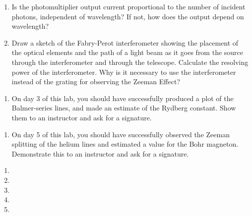 \documentclass{signatures}
\begin{document}
\begin{enumerate}
    \item Is the photomultiplier output current proportional to the number of incident photons, independent of wavelength? If not, how does the output depend on wavelength?

    \item Draw a sketch of the Fabry-Perot interferometer showing the placement of the optical elements and the path of a light beam as it goes from the source through the interferometer and through the telescope. Calculate the resolving power of the interferometer. Why is it necessary to use the interferometer instead of the grating for observing the Zeeman Effect?
       \\[36pt]
\end{enumerate}

\prelabsignatures

\midlab

\begin{enumerate}

    \item On day 3 of this lab, you should have successfully produced a plot of the Balmer-series lines, and made an estimate of the Rydberg constant. Show them to an instructor and ask for a signature. 
\\[36pt]
\end{enumerate}


\begin{enumerate}

\item On day 5 of this lab, you should have successfully observed the Zeeman splitting of the helium lines and estimated a value for the Bohr magneton. Demonstrate this to an instructor and ask for a signature.
\\[36pt]
\end{enumerate}


\checkpointsection 

\begin{enumerate}

\item {}

\item {}

\item {}

\item {}

\item {}

\end{enumerate}
\end{document}
